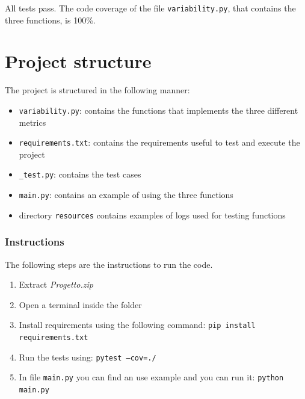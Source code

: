 \documentclass[12pt]{article}
\begin{document}
\noindent All tests pass. The code coverage of the file \texttt{variability.py}, that contains the three functions, is 100\%.

\section*{Project structure}\label{section:structure}

The project is structured in the following manner:
\begin{itemize}
	\item \texttt{variability.py}: contains the functions that implements the three different metrics
	\item \texttt{requirements.txt}: contains the requirements useful to test and execute the project
	\item \texttt{\_test.py}: contains the test cases
	\item \texttt{main.py}: contains an example of using the three functions
	\item directory \texttt{resources} contains examples of logs used for testing functions
\end{itemize}

\subsubsection*{Instructions}

The following steps are the instructions to run the code.
\begin{enumerate}
	\item Extract \textit{Progetto.zip}
	\item Open a terminal inside the folder
	\item Install requirements using the following command: \texttt{pip install requirements.txt}
	\item Run the tests using: \texttt{pytest --cov=./}
	\item In file \texttt{main.py} you can find an use example and you can run it: \texttt{python main.py}
\end{enumerate}

 

\end{document}
